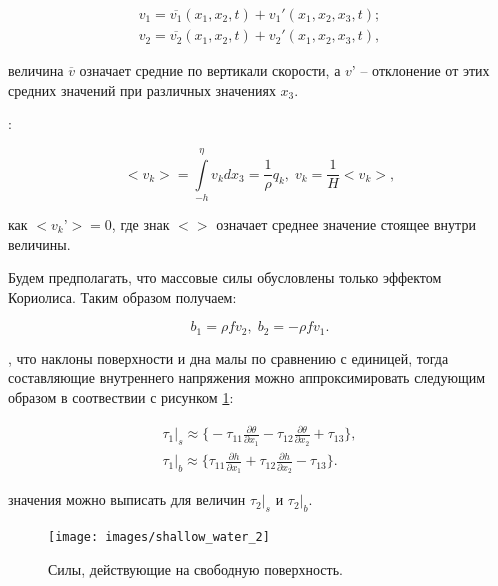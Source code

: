 \documentclass[14pt]{extreport}
\begin{document}
\begin{equation}\label{eq:shallow_water:13}
\begin{aligned}
v_1 = \overline{v_1} (x_1, x_2, t) + v_1'(x_1, x_2, x_3, t);\\
v_2 = \overline{v_2} (x_1, x_2, t) + v_2'(x_1, x_2, x_3, t),
\end{aligned}
\end{equation}

 величина $\overline{v}$ означает средние по вертикали скорости, а $v’$ -- отклонение от этих средних значений при различных значениях $x_3$.

:

\begin{equation}\label{eq:shallow_water:14}
<v_k>=\int\limits^\eta_{-h} v_k dx_3 = \frac{1}{\rho} q_k, \; v_k=\frac{1}{H}<v_k>,
\end{equation}

 как $<v_k’> = 0$, где знак $<>$ означает среднее значение стоящее внутри величины.

Будем предполагать, что массовые силы обусловлены только эффектом Кориолиса. Таким образом получаем:

\begin{equation}\label{eq:shallow_water:15}
b_1 = \rho f v_2, \; b_2 = - \rho f v_1.
\end{equation}

, что наклоны поверхности и дна малы по сравнению с единицей, тогда составляющие внутреннего напряжения можно аппроксимировать следующим образом в соотвествии с рисунком \ref{img:shallow_water:2}:

\begin{equation}\label{eq:shallow_water:16}
\begin{aligned}
 \tau_1\bigg|_s \approx \bigg\{ -\tau_{11}\frac{\partial \theta}{\partial x_1} -\tau_{12}\frac{\partial \theta}{\partial x_2} +\tau_{13}\bigg\}, \\
\tau_1\bigg|_b \approx \bigg\{ \tau_{11}\frac{\partial h}{\partial x_1} +\tau_{12}\frac{\partial h}{\partial x_2} -\tau_{13}\bigg\}.
\end{aligned}
\end{equation}

 значения можно выписать для величин $\tau_2|_s$ и $\tau_2|_b$.

\begin{figure}[H]
\centerline{
\texttt{[image: images/shallow\_water\_2]}}
\caption{Силы, действующие на свободную поверхность.}
\label{img:shallow_water:2}
\end{figure}
\end{document}
